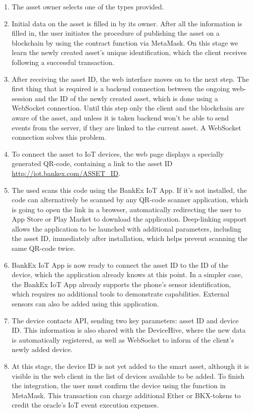\documentclass{article}
\begin{document}
\begin{multicols}{2}
\begin{enumerate}
\item The asset owner selects one of the types provided.
\item Initial data on the asset is filled in by its owner. After all the information is filled in, the user initiates the procedure of publishing the asset on a blockchain by using the contract function via MetaMask. On this stage we learn the newly created asset’s unique identification, which the client receives following a successful transaction.
\item After receiving the asset ID, the web interface moves on to the next step. The first thing that is required is a backend connection between the ongoing web-session and the ID of the newly created asset, which is done using a WebSocket connection. Until this step only the client and the blockchain are aware of the asset, and unless it is taken backend won’t be able to send events from the server, if they are linked to the current asset. A WebSocket connection solves this problem.
\item To connect the asset to IoT devices, the web page displays a specially generated QR-code, containing a link to the asset ID \url{http://iot.bankex.com/ASSET_ID}.
\item The used scans this code using the BankEx IoT App. If it’s not installed, the code can alternatively be scanned by any QR-code scanner application, which is going to open the link in a browser, automatically redirecting the user to App Store or Play Market to download the application. Deep-linking support allows the application to be launched with additional parameters, including the asset ID, immediately after installation, which helps prevent scanning the same QR-code twice.
\item BankEx IoT App is now ready to connect the asset ID to the ID of the device, which the application already knows at this point. In a simpler case, the BankEx IoT App already supports the phone’s sensor identification, which requires no additional tools to demonstrate capabilities. External sensors can also be added using this application. 
\item The device contacts API, sending two key parameters: asset ID and device ID. This information is also shared with the DeviceHive, where the new data is automatically registered, as well as WebSocket to inform of the client’s newly added device. 
\item At this stage, the device ID is not yet added to the smart asset, although it is visible in the web client in the list of devices available to be added. To finish the integration, the user must confirm the device using the function in MetaMask. This transaction can charge additional Ether or BKX-tokens to credit the oracle’s IoT event execution expenses.
\end{enumerate}

\end{multicols}
\end{document}

